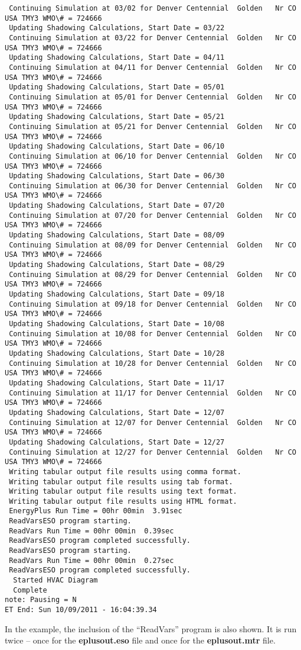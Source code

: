 \begin{lstlisting}
 Continuing Simulation at 03/02 for Denver Centennial  Golden   Nr CO USA TMY3 WMO\# = 724666
 Updating Shadowing Calculations, Start Date = 03/22
 Continuing Simulation at 03/22 for Denver Centennial  Golden   Nr CO USA TMY3 WMO\# = 724666
 Updating Shadowing Calculations, Start Date = 04/11
 Continuing Simulation at 04/11 for Denver Centennial  Golden   Nr CO USA TMY3 WMO\# = 724666
 Updating Shadowing Calculations, Start Date = 05/01
 Continuing Simulation at 05/01 for Denver Centennial  Golden   Nr CO USA TMY3 WMO\# = 724666
 Updating Shadowing Calculations, Start Date = 05/21
 Continuing Simulation at 05/21 for Denver Centennial  Golden   Nr CO USA TMY3 WMO\# = 724666
 Updating Shadowing Calculations, Start Date = 06/10
 Continuing Simulation at 06/10 for Denver Centennial  Golden   Nr CO USA TMY3 WMO\# = 724666
 Updating Shadowing Calculations, Start Date = 06/30
 Continuing Simulation at 06/30 for Denver Centennial  Golden   Nr CO USA TMY3 WMO\# = 724666
 Updating Shadowing Calculations, Start Date = 07/20
 Continuing Simulation at 07/20 for Denver Centennial  Golden   Nr CO USA TMY3 WMO\# = 724666
 Updating Shadowing Calculations, Start Date = 08/09
 Continuing Simulation at 08/09 for Denver Centennial  Golden   Nr CO USA TMY3 WMO\# = 724666
 Updating Shadowing Calculations, Start Date = 08/29
 Continuing Simulation at 08/29 for Denver Centennial  Golden   Nr CO USA TMY3 WMO\# = 724666
 Updating Shadowing Calculations, Start Date = 09/18
 Continuing Simulation at 09/18 for Denver Centennial  Golden   Nr CO USA TMY3 WMO\# = 724666
 Updating Shadowing Calculations, Start Date = 10/08
 Continuing Simulation at 10/08 for Denver Centennial  Golden   Nr CO USA TMY3 WMO\# = 724666
 Updating Shadowing Calculations, Start Date = 10/28
 Continuing Simulation at 10/28 for Denver Centennial  Golden   Nr CO USA TMY3 WMO\# = 724666
 Updating Shadowing Calculations, Start Date = 11/17
 Continuing Simulation at 11/17 for Denver Centennial  Golden   Nr CO USA TMY3 WMO\# = 724666
 Updating Shadowing Calculations, Start Date = 12/07
 Continuing Simulation at 12/07 for Denver Centennial  Golden   Nr CO USA TMY3 WMO\# = 724666
 Updating Shadowing Calculations, Start Date = 12/27
 Continuing Simulation at 12/27 for Denver Centennial  Golden   Nr CO USA TMY3 WMO\# = 724666
 Writing tabular output file results using comma format.
 Writing tabular output file results using tab format.
 Writing tabular output file results using text format.
 Writing tabular output file results using HTML format.
 EnergyPlus Run Time = 00hr 00min  3.91sec
 ReadVarsESO program starting.
 ReadVars Run Time = 00hr 00min  0.39sec
 ReadVarsESO program completed successfully.
 ReadVarsESO program starting.
 ReadVars Run Time = 00hr 00min  0.27sec
 ReadVarsESO program completed successfully.
  Started HVAC Diagram
  Complete
note: Pausing = N
ET End: Sun 10/09/2011 - 16:04:39.34
\end{lstlisting}

In the example, the inclusion of the ``ReadVars'' program is also shown. It is run twice -- once for the \textbf{eplusout.eso} file and once for the \textbf{eplusout.mtr} file.
